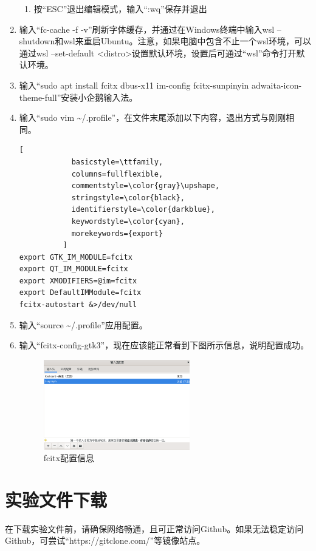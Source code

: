 \documentclass[fontset=ubuntu]{ctexart}
\begin{document}
\begin{enumerate}
\begin{enumerate}
              \item 按“ESC”退出编辑模式，输入“:wq”保存并退出
          \end{enumerate}
    \item 输入“fc-cache -f -v”刷新字体缓存，并通过在Windows终端中输入wsl --shutdown和wsl来重启Ubuntu。注意，如果电脑中包含不止一个wsl环境，可以通过wsl --set-default <distro>设置默认环境，设置后可通过“wsl”命令打开默认环境。
    \item 输入“sudo apt install fcitx dbus-x11 im-config fcitx-sunpinyin adwaita-icon-theme-full”安装小企鹅输入法。
    \item 输入“sudo vim \~{}/.profile”，在文件末尾添加以下内容，退出方式与刚刚相同。
          \begin{lstlisting}[
            basicstyle=\ttfamily,
            columns=fullflexible,
            commentstyle=\color{gray}\upshape,
            stringstyle=\color{black},
            identifierstyle=\color{darkblue},
            keywordstyle=\color{cyan},
            morekeywords={export}
          ]
export GTK_IM_MODULE=fcitx
export QT_IM_MODULE=fcitx
export XMODIFIERS=@im=fcitx
export DefaultIMModule=fcitx
fcitx-autostart &>/dev/null
\end{lstlisting}
    \item 输入“source \~{}/.profile”应用配置。
    \item 输入“fcitx-config-gtk3”，现在应该能正常看到下图所示信息，说明配置成功。
          \begin{figure}[htbp]
              \centering
              \includegraphics[width=0.6\textwidth]{./README.assets/fcitx.png}
              \caption{fcitx配置信息}
          \end{figure}
\end{enumerate}

\section{实验文件下载}

在下载实验文件前，请确保网络畅通，且可正常访问Github。如果无法稳定访问Github，可尝试“https://gitclone.com/”等镜像站点。
\end{document}
